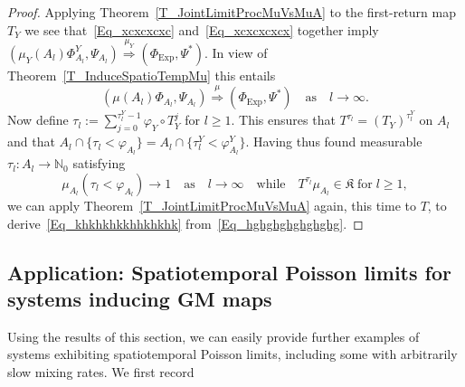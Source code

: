\documentclass[AHL,Unicode,longabstracts]{cedram}
\newcommand{\Expl}{\mathrm{Exp}}
\newcommand{\frkK}{\mathfrak{K}}
\newcommand{\bbN}{\mathbb{N}}
\begin{document}
\begin{proof}
Applying Theorem~\ref{T_JointLimitProcMuVsMuA} to the first-return map $T_{Y} $ we see that~\eqref{Eq_xcxcxcxc} and~\eqref{Eq_xcxcxcxcx} together imply $(\mu_{Y}(A_{l})\Phi_{A_{l}}^{Y},\Psi_{A_{l}})\overset{\mu_{Y}} {\Longrightarrow}(\Phi_{\Expl},\Psi^{\ast})$. In view of Theorem~\ref{T_InduceSpatioTempMu} this entails
\begin{equation}\label{Eq_hghghghghghghg}
\left(\mu(A_{l})\Phi_{A_{l}},\Psi_{A_{l}}\right)\overset{\mu}{\Longrightarrow} \left(\Phi_{\Expl},\Psi^{\ast}\right)\quad\text{as}\quad l\rightarrow\infty.
\end{equation}
Now define $\tau_{l}:=\sum_{j=0}^{\tau_{l}^{Y}-1}\varphi_{Y}\circ T_{Y}^{j}$ for $l\geq1$. This ensures that $T^{\tau_{l}}=(T_{Y})^{\tau_{l}^{Y}}$ on $A_{l}$ and that $A_{l}\cap\{\tau_{l}<\varphi_{A_{l}}\}=A_{l}\cap\{\tau _{l}^{Y}<\varphi_{A_{l}}^{Y}\}$. Having thus found measurable $\tau_{l} :A_{l}\rightarrow\bbN_{0}$ satisfying
\[
\mu_{A_{l}}\left(\tau_{l}<\varphi_{A_{l}}\right) \longrightarrow1\quad\text{as}\quad l\rightarrow\infty\quad\text{while}\quad T^{\tau_{l}}\mu_{A_{l}}
\in\frkK\;\text{for}\;l\geq1,
\]
we can apply Theorem~\ref{T_JointLimitProcMuVsMuA} again, this time to $T$, to derive~\eqref{Eq_khkhkhkkhhkhkhk} from~\eqref{Eq_hghghghghghghg}.
\end{proof}

\subsection{Application: Spatiotemporal Poisson limits for systems inducing GM maps}
Using the results of this section, we can easily provide further examples of systems exhibiting spatiotemporal Poisson limits, including some with arbitrarily slow mixing rates. We first record
\end{document}

